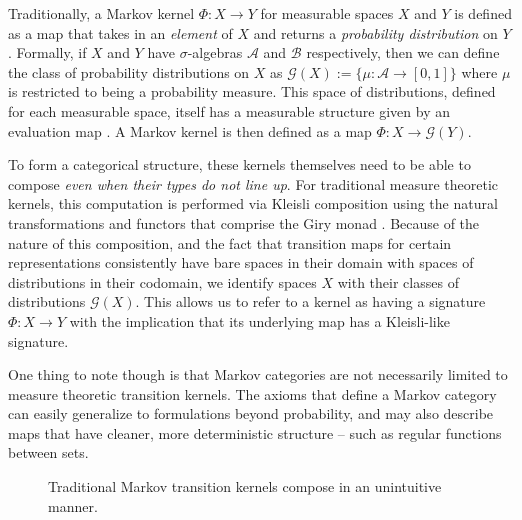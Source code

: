 \documentclass[letterpaper, 10 pt, conference]{ieeeconf}  %
\begin{document}
\newcommand{\giry}{\mathcal{G}}
Traditionally, a Markov kernel $\Phi:X\rightarrow Y$ for measurable spaces $X$ and $Y$ is defined as a map that takes in an \emph{element} of $X$ and returns a \emph{probability distribution} on $Y$.
Formally, if $X$ and $Y$ have $\sigma$-algebras $\mathcal{A}$ and $\mathcal{B}$ respectively, then we can define the class of probability distributions on $X$ as $\giry(X) := \{\mu : \mathcal{A} \rightarrow [0,1] \}$ where $\mu$ is restricted to being a probability measure.
This space of distributions, defined for each measurable space, itself has a measurable structure given by an evaluation map \cite{giry}.
A Markov kernel is then defined as a map $\Phi: X \rightarrow \giry(Y)$.

To form a categorical structure, these kernels themselves need to be able to compose \emph{even when their types do not line up}.
For traditional measure theoretic kernels, this computation is performed via Kleisli composition using the natural transformations and functors that comprise the Giry monad \cite{giry}\cite{cho}\cite{fritz}.
Because of the nature of this composition, and the fact that transition maps for certain representations consistently have bare spaces in their domain with spaces of distributions in their codomain, we identify spaces $X$ with their classes of distributions $\giry(X)$.
This allows us to refer to a kernel as having a signature $\Phi:X\rightarrow Y$ with the implication that its underlying map has a Kleisli-like signature.

One thing to note though is that Markov categories are not necessarily limited to measure theoretic transition kernels.
The axioms that define a Markov category can easily generalize to formulations beyond probability, and may also describe maps that have cleaner, more deterministic structure -- such as regular functions between sets.

\begin{figure}[thpb]
    \centering
    \caption{Traditional Markov transition kernels compose in an unintuitive manner.}
\end{figure}
\end{document}
